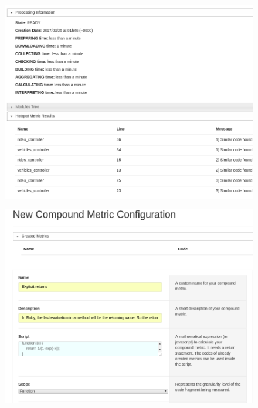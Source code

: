 \documentclass{llncs}
\begin{document}
\begin{figure}[H]
    \centering
    \begin{minipage}{.5\textwidth}
        \centering
        \includegraphics[width=.9\linewidth]{images/mezuro-feature1.png}
        \label{fig:feature-1}
    \end{minipage}%
    \begin{minipage}{.5\textwidth}
        \centering
        \includegraphics[width=.9\linewidth]{images/mezuro-feature2.png}
        \label{fig:feature-2}
    \end{minipage}
\end{figure}

\end{document}
